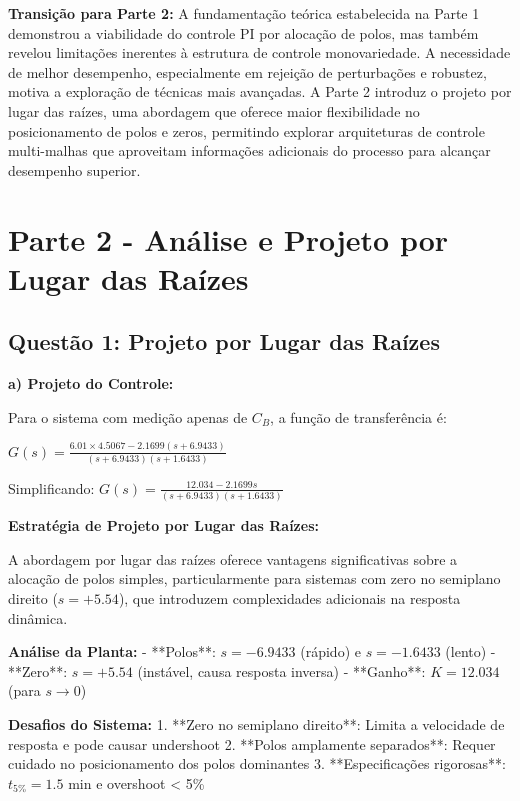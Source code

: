\documentclass[a4paper,12pt]{article}
\begin{document}
\textbf{Transição para Parte 2:} A fundamentação teórica estabelecida na Parte 1 demonstrou a viabilidade do controle PI por alocação de polos, mas também revelou limitações inerentes à estrutura de controle monovariedade. A necessidade de melhor desempenho, especialmente em rejeição de perturbações e robustez, motiva a exploração de técnicas mais avançadas. A Parte 2 introduz o projeto por lugar das raízes, uma abordagem que oferece maior flexibilidade no posicionamento de polos e zeros, permitindo explorar arquiteturas de controle multi-malhas que aproveitam informações adicionais do processo para alcançar desempenho superior.

\newpage

\section{Parte 2 - Análise e Projeto por Lugar das Raízes}

\subsection{Questão 1: Projeto por Lugar das Raízes}

\textbf{a) Projeto do Controle:}

Para o sistema com medição apenas de $C_B$, a função de transferência é:

$G(s) = \frac{6.01 \times 4.5067 - 2.1699(s + 6.9433)}{(s + 6.9433)(s + 1.6433)}$

Simplificando: $G(s) = \frac{12.034 - 2.1699s}{(s + 6.9433)(s + 1.6433)}$

\textbf{Estratégia de Projeto por Lugar das Raízes:}

A abordagem por lugar das raízes oferece vantagens significativas sobre a alocação de polos simples, particularmente para sistemas com zero no semiplano direito ($s = +5.54$), que introduzem complexidades adicionais na resposta dinâmica.

\textbf{Análise da Planta:}
- **Polos**: $s = -6.9433$ (rápido) e $s = -1.6433$ (lento)
- **Zero**: $s = +5.54$ (instável, causa resposta inversa)
- **Ganho**: $K = 12.034$ (para $s \rightarrow 0$)

\textbf{Desafios do Sistema:}
1. **Zero no semiplano direito**: Limita a velocidade de resposta e pode causar undershoot
2. **Polos amplamente separados**: Requer cuidado no posicionamento dos polos dominantes
3. **Especificações rigorosas**: $t_{5\%} = 1.5$ min e overshoot < 5\%
\end{document}
